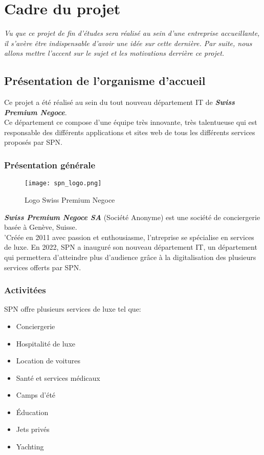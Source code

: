 \section{Cadre du projet}
\small{\textit{Vu que ce projet de fin d'études sera réalisé au sein d'une entreprise accueillante, il s'avère être indispensable d'avoir une idée sur cette dernière. Par suite, nous allons mettre l'accent sur le sujet et les motivations derrière ce projet.}}
\subsection{Présentation de l'organisme d'accueil}
Ce projet a été réalisé au sein du tout nouveau département IT de \textit{\textbf{Swiss Premium Negoce}}.\\
\noindent Ce département ce compose d'une équipe très innovante, très talentueuse qui est responsable des différents applications et sites web de tous les différents services proposés par SPN.
\subsubsection{Présentation générale}
\vspace{1cm}
\begin{figure}[H]
    \centering
    \texttt{[image: spn\_logo.png]}
    \vspace{0.5cm}
    \caption{Logo Swiss Premium Negoce}
    \label{fig:spn_logo}
\end{figure}
\vspace{1cm}
\textit{\textbf{Swiss Premium Negoce SA}} (Société Anonyme) est une société de conciergerie basée à Genève, Suisse.\\
\noindent 'Créée en 2011 avec passion et enthousiasme, l'ntreprise se spécialise en services de luxe.
En 2022, SPN a inauguré son nouveau département IT, un département qui permettera d'atteindre plus d'audience grâce à la digitalisation des plusieurs services offerts par SPN.
\subsubsection{Activitées}
SPN offre plusieurs services de luxe tel que:
\begin{itemize}
    \item Conciergerie
    \item Hospitalité de luxe
    \item Location de voitures
    \item Santé et services médicaux
    \item Camps d'été
    \item Éducation
    \item Jets privés
    \item Yachting
\end{itemize}
